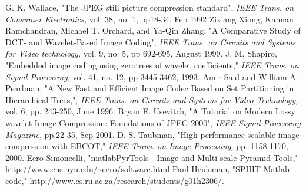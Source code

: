 \documentclass[article,oneside]{memoir}
\begin{document}
 \begin{thebibliography}{99}

 G. K. Wallace, "The JPEG still picture compression standard", \textit{IEEE Trans. on Consumer Electronics,} vol. 38, no. 1, pp18-34, Feb 1992
 Zixiang Xiong, Kannan Ramchandran, Michael T. Orchard, and Ya-Qin Zhang, "A Comparative Study of DCT- and Wavelet-Based Image Coding", \textit{IEEE Trans. on Circuits and Systems for Video technology,} vol. 9, no. 5, pp 692-695, August 1999. 
 J. M. Shapiro, "Embedded image coding using zerotrees of wavelet coefficients," \textit{IEEE Trans. on Signal Processing,} vol. 41, no. 12, pp 3445-3462, 1993. 
 Amir Said and William A. Pearlman, "A New Fast and Efficient Image Codec Based on Set Partitioning in Hierarchical Trees,", \textit{IEEE Trans. on Circuits and Systems for Video Technology,} vol. 6, pp. 243-250, June 1996. 
 Bryan E. Usevitch, "A Tutorial on Modern Lossy wavelet Image Compression: Foundations of JPEG 2000", \textit{IEEE Signal Processing Magazine,} pp.22-35, Sep 2001. 
 D. S. Taubman, "High performance scalable image compression with EBCOT," \textit{IEEE Trans. on Image Processing,} pp. 1158-1170, 2000.
 Eero Simoncelli, "matlabPyrTools - Image and Multi-scale Pyramid Tools,"  \url{http://www.cns.nyu.edu/~eero/software.html}
 Paul Heideman, "SPIHT Matlab code," \url{http://www.cs.ru.ac.za/research/students/g01h2306/}. 
\end{thebibliography}
\end{document}
